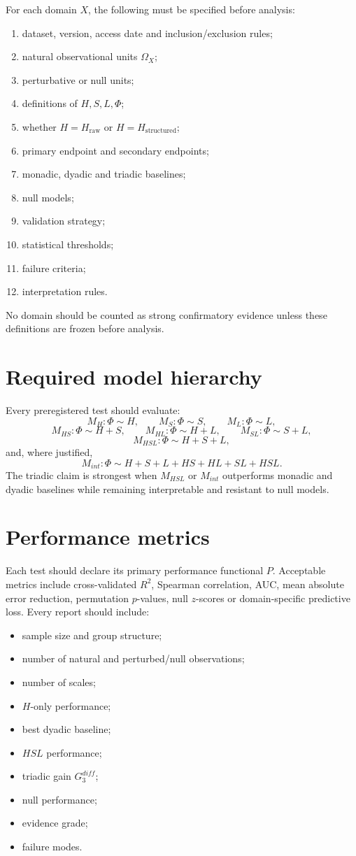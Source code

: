 \documentclass[11pt,a4paper]{article}
\newcommand{\Hraw}{H_{\mathrm{raw}}}
\newcommand{\Hstr}{H_{\mathrm{structured}}}
\begin{document}
For each domain $X$, the following must be specified before analysis:
\begin{enumerate}
\item dataset, version, access date and inclusion/exclusion rules;
\item natural observational units $\Omega_X$;
\item perturbative or null units;
\item definitions of $H,S,L,\Phi$;
\item whether $H=\Hraw$ or $H=\Hstr$;
\item primary endpoint and secondary endpoints;
\item monadic, dyadic and triadic baselines;
\item null models;
\item validation strategy;
\item statistical thresholds;
\item failure criteria;
\item interpretation rules.
\end{enumerate}
No domain should be counted as strong confirmatory evidence unless these definitions are frozen before analysis.

\section{Required model hierarchy}

Every preregistered test should evaluate:
\[
M_H:\Phi\sim H,\qquad
M_S:\Phi\sim S,\qquad
M_L:\Phi\sim L,
\]
\[
M_{HS}:\Phi\sim H+S,\qquad
M_{HL}:\Phi\sim H+L,\qquad
M_{SL}:\Phi\sim S+L,
\]
\[
M_{HSL}:\Phi\sim H+S+L,
\]
and, where justified,
\[
M_{int}:\Phi\sim H+S+L+HS+HL+SL+HSL.
\]
The triadic claim is strongest when $M_{HSL}$ or $M_{int}$ outperforms monadic and dyadic baselines while remaining interpretable and resistant to null models.

\section{Performance metrics}

Each test should declare its primary performance functional $P$.
Acceptable metrics include cross-validated $R^2$, Spearman correlation, AUC, mean absolute error reduction, permutation $p$-values, null $z$-scores or domain-specific predictive loss.
Every report should include:
\begin{itemize}
\item sample size and group structure;
\item number of natural and perturbed/null observations;
\item number of scales;
\item $H$-only performance;
\item best dyadic baseline;
\item $HSL$ performance;
\item triadic gain $G_3^{diff}$;
\item null performance;
\item evidence grade;
\item failure modes.
\end{itemize}
\end{document}
